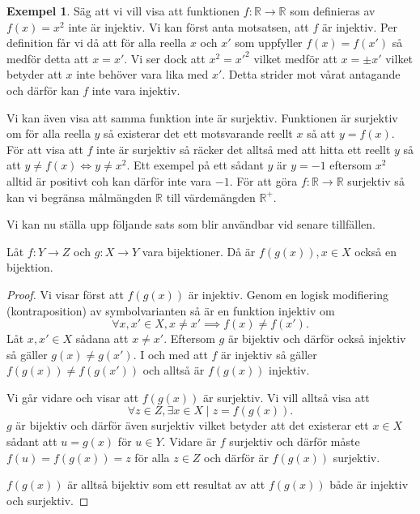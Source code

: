 \documentclass{article}
\theoremstyle{definition}
\newtheorem{exmp}[thm]{Exempel}
\begin{document}
\begin{exmp}
Säg att vi vill visa att funktionen $f: \mathbb{R} \rightarrow \mathbb{R}$ som definieras av 
$f(x) = x^2$ inte är injektiv. Vi kan först anta motsatsen, att $f$ är injektiv. Per definition får vi då att för alla reella $x$ och $x'$ som uppfyller $f(x) = f(x')$
så medför detta att $x = x'$. Vi ser dock att $x^2 = x'^2$ vilket medför att $x = \pm x'$ vilket betyder att $x$ inte behöver vara lika med $x'$. Detta strider mot vårat antagande och
därför kan $f$ inte vara injektiv.

Vi kan även visa att samma funktion inte är surjektiv. Funktionen är surjektiv om för alla reella $y$ så existerar det ett motsvarande reellt $x$ så att $y=f(x)$. För 
att visa att $f$ inte är surjektiv så räcker det alltså med att hitta ett reellt $y$ så att $y \neq f(x) \iff y \neq x^2$. Ett exempel på ett sådant $y$ är $y = -1$ eftersom $x^2$
alltid är positivt coh kan därför inte vara $-1$. För att göra $f: \mathbb{R} \rightarrow \mathbb{R}$ surjektiv så kan vi begränsa målmängden $\mathbb{R}$ till värdemängden $\mathbb{R}^+$.

\end{exmp}

Vi kan nu ställa upp följande sats som blir användbar vid senare tillfällen. 
\hypertarget{kompbij}{}
\begin{mytheo}{}{}
  Låt $f: Y \rightarrow Z$ och $g: X \rightarrow Y$ vara bijektioner. Då är $f(g(x)), x \in X$ 
  också en bijektion.
\end{mytheo}
\begin{proof}
  Vi visar först att $f(g(x))$ är injektiv. Genom en logisk modifiering (kontraposition) av symbolvarianten 
  så är en funktion injektiv om
  \[ \forall x, x' \in X, x \neq x' \implies f(x) \neq f(x'). \]
  Låt $x, x' \in X$ sådana att $x \neq x'.$ Eftersom $g$ är bijektiv och därför också injektiv 
  så gäller $g(x) \neq g(x')$. I och med att $f$ är injektiv så gäller $f(g(x)) \neq f(g(x'))$
  och alltså är $f(g(x))$ injektiv.

  Vi går vidare och visar att $f(g(x))$ är surjektiv. Vi vill alltså visa att 
  \[\forall z \in Z, \exists x \in X \; | \; z = f(g(x)).\]
  $g$ är bijektiv och därför även surjektiv vilket betyder att det existerar 
  ett $x \in X$ sådant att $u = g(x)$ för $u \in Y.$ Vidare är $f$ surjektiv och därför 
  måste $f(u) = f(g(x)) = z$ för alla $z \in Z$ och därför är $f(g(x))$ surjektiv.
  
  $f(g(x))$ är alltså bijektiv som ett resultat av att $f(g(x))$ både är injektiv och surjektiv. 
\end{proof}
\end{document}
